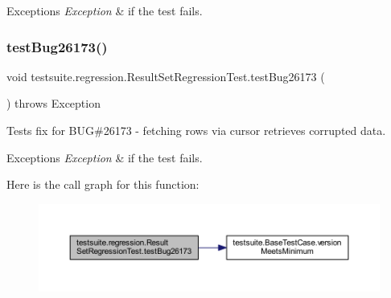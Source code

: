\begin{DoxyExceptions}{Exceptions}
{\em Exception} & if the test fails. \\
\hline
\end{DoxyExceptions}
\mbox{\label{classtestsuite_1_1regression_1_1_result_set_regression_test_afa0bbccee8e4bffb0576ef3c0cd096f0}} 
\subsubsection{\texorpdfstring{test\+Bug26173()}{testBug26173()}}
{\footnotesize\ttfamily void testsuite.\+regression.\+Result\+Set\+Regression\+Test.\+test\+Bug26173 (\begin{DoxyParamCaption}{ }\end{DoxyParamCaption}) throws Exception}

Tests fix for B\+UG\#26173 -\/ fetching rows via cursor retrieves corrupted data.


\begin{DoxyExceptions}{Exceptions}
{\em Exception} & if the test fails. \\
\hline
\end{DoxyExceptions}
Here is the call graph for this function\+:
\nopagebreak
\begin{figure}[H]
\begin{center}
\leavevmode
\includegraphics[width=350pt]{classtestsuite_1_1regression_1_1_result_set_regression_test_afa0bbccee8e4bffb0576ef3c0cd096f0_cgraph}
\end{center}
\end{figure}
\mbox{\label{classtestsuite_1_1regression_1_1_result_set_regression_test_a5cf13074c3f54ef463c169be1423a3ba}} 
